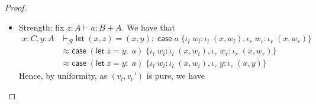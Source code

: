 \documentclass[acmsmall,screen,review]{acmart}
\newcommand{\mc}[1]{\ensuremath{\mathcal{#1}}}
\newcommand{\ms}[1]{\ensuremath{\mathsf{#1}}}
\newcommand{\lto}{:}
\newcommand{\linl}[1]{\iota_l\;{#1}}
\newcommand{\linr}[1]{\iota_r\;{#1}}
\newcommand{\letexpr}[3]{\ensuremath{\ms{let}\;#1 = #2;\;#3}}
\newcommand{\caseexpr}[5]{\ms{case}\;#1\;\{\linl{#2} \lto #3, \linr{#4} \lto #5\}}
\newcommand{\liter}[3]{\ms{iter}\;#1\;\{ \linr{#2} \lto #3 \}}
\newcommand{\einf}[1]{#1 \in \mc{E}^\infty}
\newcommand{\hasty}[4]{#1 \vdash_{#2} #3: {#4}}
\newcommand{\cref}{\twoheadrightarrow}
\newcommand{\brle}[1]{{\textsf{#1}}}
\begin{document}
\begin{proof}
\begin{itemize}
\begin{itemize}
\begin{align*}
      = ((\lambda x.a) ; [\ms{id}, \iota_r])^\dagger
    \end{align*}
    \item Directed Uniformity: assume that
    \begin{align*}
    (\lambda x . a) ; (\lambda y . b) \cref^p (\lambda y . b') ; \ms{id} + (\lambda x . a)
    \end{align*}
    Unfolding both sides of this refinement, we hence have that
    \begin{align*}
    (\lambda x . \letexpr{y}{a}{b}) \cref^p
    (\lambda y . \caseexpr{b'}{z}{\linl{z}}{x}{\linr{a}})
    \end{align*}
    We therefore, by \brle{unif$^p$}, have that
    \begin{align*}
    (\lambda x . a) ; (\lambda y . b)^\dagger 
    &= (\lambda x. \liter{a}{y}{b}) 
     = (\lambda z. \letexpr{x}{z}{\liter{a}{y}{b}})
    \\
    &\cref^p (\lambda z. \liter{z}{y}{b'}) = (\lambda y . b')^\dagger
    \end{align*}
    as desired.
    \item Dinaturality: we have that
    \begin{proposition}
      If $(-)^\dagger$ is an iteration operator which satisfies naturality and codiagonal and is
      $\mc{K}$-uniform for $\mc{K}$ cocartesian, then it also satisfies dinaturality.
    \end{proposition}
    \begin{proof}
      See Lemma 31 of \citet{goncharov-18-guarded-traced}
    \end{proof}
    Since all $\ms{Tm}_\epsilon(\mc{R})$ for $\einf{\epsilon}$ are $\ms{Tm}_\bot(\mc{R})$-uniform,
    and $\ms{Tm}_\bot(\mc{R})$ is cocartesian, $\ms{Tm}_\epsilon(\mc{R})$ must in fact satisfy
    dinaturality as desired.
  \end{itemize}
  \item Strength: fix $\hasty{z : A}{}{a}{B + A}$. We have that
  \begin{align*}
    x : C, y : A &
      \vdash_{\mc{R}} 
      \letexpr{(x, z)}{(x, y)}{\caseexpr{a}{w_l}{\linl{(x, w_l)}}{w_r}{\linr{(x, w_r)}}} \\
      &\approx \caseexpr{(\letexpr{z}{y}{a})}{w_l}{\linl{(x, w_l)}}{w_r}{\linr{(x, w_r)}} \\
      &\approx \caseexpr{(\letexpr{z}{y}{a})}{w_l}{\linl{(x, w_l)}}{y}{\linr{(x, y)}}
  \end{align*}
  Hence, by uniformity, as $(v_l, v_r')$ is pure, we have

\end{itemize}
\end{proof}
\end{document}
